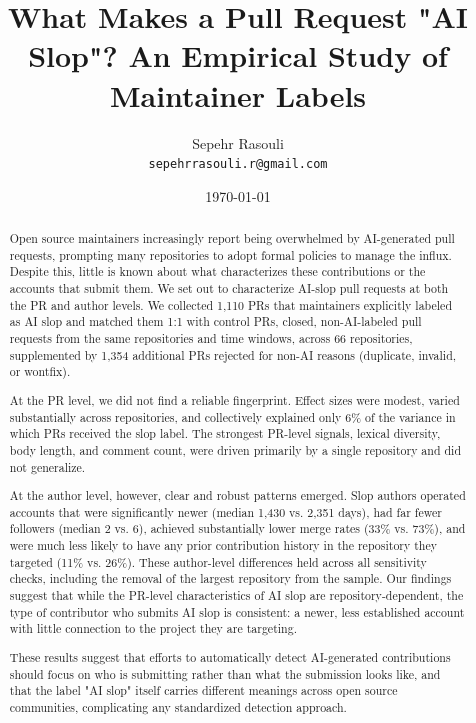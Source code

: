 \documentclass[11pt]{article}
\title{What Makes a Pull Request "AI Slop"? An Empirical Study of Maintainer Labels}
\author{Sepehr Rasouli\\
		\texttt{sepehrrasouli.r@gmail.com}}
\date{\today}
\begin{document}
	\maketitle
	\begin{abstract}
	Open source maintainers increasingly report being overwhelmed by AI-generated pull requests, prompting many repositories to adopt formal policies to manage the influx. Despite this, little is known about what characterizes these contributions or the accounts that submit them. We set out to characterize AI-slop pull requests at both the PR and author levels. We collected 1,110 PRs that maintainers explicitly labeled as AI slop and matched them 1:1 with control PRs, closed, non-AI-labeled pull requests from the same repositories and time windows, across 66 repositories, supplemented by 1,354 additional PRs rejected for non-AI reasons (duplicate, invalid, or wontfix).
	
	At the PR level, we did not find a reliable fingerprint. Effect sizes were modest, varied substantially across repositories, and collectively explained only 6\% of the variance in which PRs received the slop label. The strongest PR-level signals, lexical diversity, body length, and comment count, were driven primarily by a single repository and did not generalize.
	
	At the author level, however, clear and robust patterns emerged. Slop authors operated accounts that were significantly newer (median 1,430 vs. 2,351 days), had far fewer followers (median 2 vs. 6), achieved substantially lower merge rates (33\% vs. 73\%), and were much less likely to have any prior contribution history in the repository they targeted (11\% vs. 26\%). These author-level differences held across all sensitivity checks, including the removal of the largest repository from the sample. Our findings suggest that while the PR-level characteristics of AI slop are repository-dependent, the type of contributor who submits AI slop is consistent: a newer, less established account with little connection to the project they are targeting.
	
	These results suggest that efforts to automatically detect AI-generated contributions should focus on who is submitting rather than what the submission looks like, and that the label "AI slop" itself carries different meanings across open source communities, complicating any standardized detection approach.
	\end{abstract}
	
\end{document}

